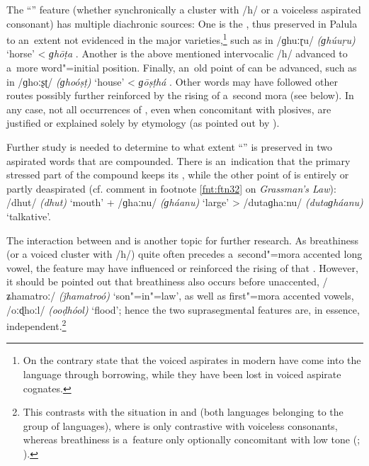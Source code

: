 The ``'' feature (whether synchronically a cluster with /h/ or a voiceless aspirated consonant) has multiple diachronic sources: One is the  , thus preserved in Palula to an~extent not evidenced in the major  varieties,\footnote{On the contrary \citet[30]{schmidtkohistani2008} state that the voiced aspirates in modern   have come into the language through borrowing, while they have been lost in  voiced aspirate cognates.} such as in /ɡhuːɽu/ \textit{(ɡhúuṛu)} `horse' {\textless}  \textit{ɡhōṭa} \citep[4516]{turner1966}. Another is the above mentioned intervocalic /h/ advanced to a~more word"=initial position. Finally, an~old point of  can be advanced, such as in /ɡhoːʂʈ/ \textit{(ɡhoóṣṭ)} `house' {\textless}  \textit{ɡōṣṭhá} \citep[4336]{turner1966}. Other words may have followed other routes possibly further reinforced by the rising  of a~second mora  (see  below). In any case, not all occurrences of , even when concomitant with plosives, are justified or explained solely by etymology (as pointed out by \citealt[57]{morgenstierne1932}).


Further study is needed to determine to what extent ``'' is preserved in two aspirated words that are compounded. There is an~indication that the primary stressed part of the compound keeps its , while the other point of  is entirely or partly deaspirated (cf. comment in footnote \ref{fnt:ftn32} on \textit{Grassman's Law}): /dhut/ \textit{(dhut)} `mouth' + /ɡhaːnu/ \textit{(ɡháanu)} `large' {\textgreater} /dutaɡhaːnu/ \textit{(dutaɡháanu)} `talkative'.


The interaction between  and  is another topic for further research. As breathiness (or a voiced cluster with /h/) quite often precedes a~second"=mora accented long vowel, the feature may have influenced or reinforced the rising  of that . However, it should be pointed out that breathiness also occurs before unaccented, /ʑhamatroː/ \textit{(ǰhamatroó)} `son"=in"=law', as well as first"=mora accented vowels, /oːɖhoːl/ \textit{(ooḍhóol)} `flood'; hence the two suprasegmental features are, in essence, independent.\footnote{This contrasts with the situation in  and  (both languages belonging to the  group of  languages), where  is only contrastive with voiceless consonants, whereas breathiness is a~feature only optionally concomitant with low tone (\citealt[92]{baart1999b}; \citealt[36--37]{lunsford2001}). } 


